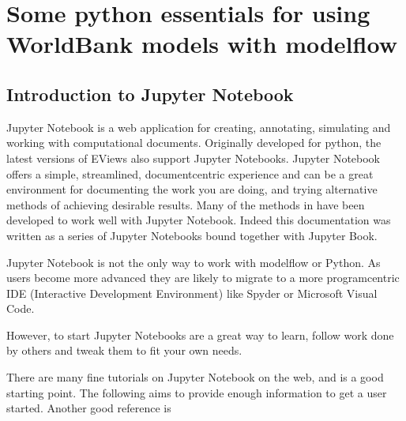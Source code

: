 \documentclass[letterpaper,10pt,english]{jupyterBook}
\begin{document}
\sphinxstepscope


\part{Some python essentials for using WorldBank models with modelflow}

\sphinxstepscope


\chapter{Introduction to  Jupyter Notebook}
\label{\detokenize{content/04_PythonEssentials/Intro_Jupyter_notebook:introduction-to-jupyter-notebook}}\label{\detokenize{content/04_PythonEssentials/Intro_Jupyter_notebook::doc}}
\sphinxAtStartPar
Jupyter Notebook is a web application for creating, annotating, simulating and working with computational documents.  Originally developed for python, the latest versions of EViews also support Jupyter Notebooks. Jupyter Notebook offers a simple, streamlined, document\sphinxhyphen{}centric experience and can be a great environment for documenting the work you are doing, and trying alternative methods of achieving desirable results.  Many of the methods in  have been developed to work well with Jupyter Notebook. Indeed this documentation was written as a series of Jupyter Notebooks bound together with Jupyter Book.

\sphinxAtStartPar
Jupyter Notebook is not the only way to work with modelflow or Python.  As users become more advanced they are likely to migrate to a more program\sphinxhyphen{}centric IDE (Interactive Development Environment) like Spyder or Microsoft Visual Code.

\sphinxAtStartPar
However, to start Jupyter Notebooks are a great way to learn, follow work done by others and tweak them to fit your own needs.

\sphinxAtStartPar
There are many fine tutorials on Jupyter Notebook on the web, and  is a good starting point. The following aims to provide enough information to get a user started.  Another good reference is 
\end{document}
